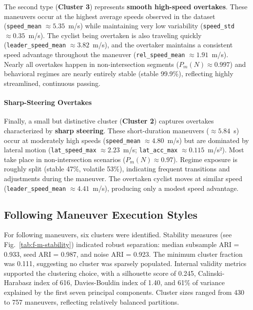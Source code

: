 
The second type (\textbf{Cluster 3}) represents \textbf{smooth high-speed overtakes}. These maneuvers occur at the highest average speeds observed in the dataset (\verb|speed_mean| $\approx 5.35$~m/s) while maintaining very low variability (\verb|speed_std| $\approx 0.35$~m/s). The cyclist being overtaken is also traveling quickly (\verb|leader_speed_mean| $\approx 3.82$~m/s), and the overtaker maintains a consistent speed advantage throughout the maneuver (\verb|rel_speed_mean| $\approx 1.91$~m/s). Nearly all overtakes happen in non-intersection segments ($P_m(N) \approx 0.997$) and behavioral regimes are nearly entirely stable (stable 99.9\%), reflecting highly streamlined, continuous passing.


\paragraph{Sharp-Steering Overtakes}

Finally, a small but distinctive cluster (\textbf{Cluster 2}) captures overtakes characterized by \textbf{sharp steering}. These short-duration maneuvers ($\approx 5.84$~s) occur at moderately high speeds (\verb|speed_mean| $\approx 4.80$~m/s) but are dominated by lateral motion (\verb|lat_speed_max| $\approx 2.23$~m/s; \verb|lat_acc_max| $\approx 0.115$~m/s²). Most take place in non-intersection scenarios ($P_m(N) \approx 0.97$). Regime exposure is roughly split (stable 47\%, volatile 53\%), indicating frequent transitions and adjustments during the maneuver. The overtaken cyclist moves at similar speed (\verb|leader_speed_mean| $\approx 4.41$~m/s), producing only a modest speed advantage.


\subsection{Following Maneuver Execution Styles}

For following maneuvers, six clusters were identified. Stability measures (see Fig.~\ref{tab:f-m-stability}) indicated robust separation: median subsample ARI = 0.933, seed ARI = 0.987, and noise ARI = 0.923. The minimum cluster fraction was 0.111, suggesting no cluster was sparsely populated. Internal validity metrics supported the clustering choice, with a silhouette score of 0.245, Calinski-Harabasz index of 616, Davies-Bouldin index of 1.40, and 61\% of variance explained by the first seven principal components. Cluster sizes ranged from 430 to 757 maneuvers, reflecting relatively balanced partitions.

